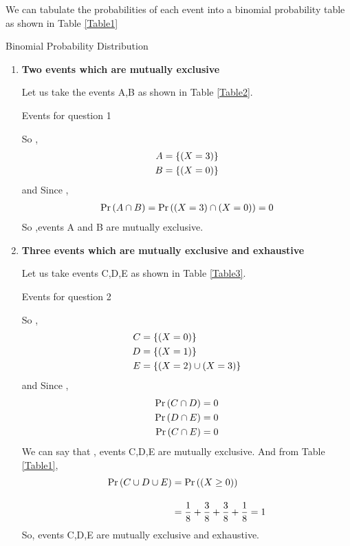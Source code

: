 \documentclass[journal,12pt,twocolumn]{IEEEtran}
\begin{document}
We can tabulate the probabilities of each event into a binomial probability table as shown in Table \ref{Table1}
\begin{table}[ht!]
\def\arraystretch{1.75}
        
        \caption{Binomial Probability Distribution}
        \label{Table1}
    \end{table}

\begin{enumerate}[label=(\roman*)]
    \item 
    \textbf{Two events which are mutually exclusive} 
    
    Let us take the events A,B as shown in Table \ref{Table2}.
    \begin{table}[ht!]
        
        \caption{Events for question 1}
        \label{Table2}
    \end{table}
    So ,
    \begin{align}
        A &= \left\{ (X=3) \right\}\\
        B &= \left\{ (X=0) \right\}
    \end{align}
    and Since ,
    \begin{align}
        \Pr\left(A \cap B\right) = \Pr\left((X=3) \cap (X=0)\right) = 0
    \end{align}
    So ,events A and B are mutually exclusive.
  
    \item \textbf{Three events which are mutually exclusive and exhaustive}
    
    Let us take events C,D,E as shown in Table \ref{Table3}.
    \begin{table}[ht!]
        
        \caption{Events for question 2}
        \label{Table3}
    \end{table}
    So ,
    \begin{align}
        C &= \left\{(X=0)\right\} \\
        D &= \left\{(X=1)\right\} \\
	    E &=  \left\{(X=2) \cup (X=3)\right\}
    \end{align}
    and Since , 
    \begin{align}
        \Pr\left(C \cap D\right) &= 0 \\
        \Pr\left(D \cap E\right) &= 0 \\
        \Pr\left(C \cap E\right) &= 0
    \end{align}
    We can say that , events C,D,E are mutually exclusive. And from Table \ref{Table1},
    \begin{align}
        \Pr\left(C \cup D \cup E\right) &= \Pr\left((X \ge 0)\right) \\[10pt]
                             &= \dfrac{1}{8}+\dfrac{3}{8}+\dfrac{3}{8}+\dfrac{1}{8} = 1
    \end{align}  
    So, events C,D,E are mutually exclusive and exhaustive.
    

\end{enumerate}
\end{document}
